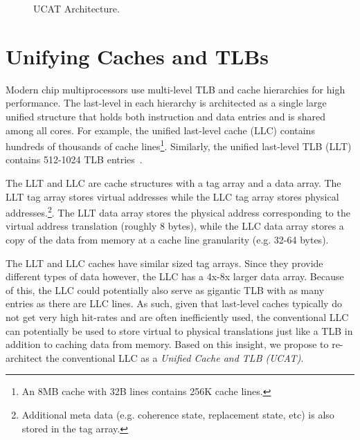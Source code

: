 \begin{figure*}[tp] 
\vspace{-0. in}
\centering
\centerline{}
\caption{\small UCAT Architecture. \normalsize}
\label{fig:pagetable_placement} 
\vspace{-0.0in}
\end{figure*}

\section{Unifying Caches and TLBs}
\label{sec:UCAT}

\noindent Modern chip multiprocessors use multi-level TLB and cache
hierarchies for high performance. The last-level in each hierarchy
is architected as a single large unified structure that holds both
instruction and data entries and is shared among all cores. For
example, the unified last-level cache (LLC) contains hundreds
of thousands of cache lines\footnote{An 8MB cache with 32B lines contains
256K cache lines.}.
Similarly, the unified last-level TLB (LLT) contains 512-1024 TLB
entries~\cite{}.

The LLT and LLC are cache structures with a tag array and a data array.
The LLT tag array stores virtual addresses while the LLC tag array
stores physical addresses.\footnote{Additional meta data (e.g.
coherence state, replacement state, etc) is also stored in the tag
array.}. The LLT data array stores the physical
address corresponding to the virtual address translation (roughly 8
bytes), while the LLC data array stores a copy of the data from memory
at a cache line granularity (e.g. 32-64 bytes).

The LLT and LLC caches have similar sized tag arrays.
Since they provide different types of data however, the LLC has a 4x-8x
larger data array. Because of this, the LLC could potentially also serve as
gigantic TLB with as many entries as there are LLC lines. 
As such, given that last-level caches typically do not get very high
hit-rates and are often inefficiently used, the conventional LLC can potentially be used to store virtual to physical
translations just like a TLB in addition to caching data from
memory. Based on this insight, we propose to re-architect the
conventional LLC as a {\em Unified Cache and TLB (UCAT)}.


